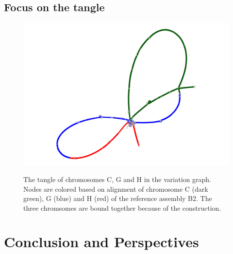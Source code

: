 \subsection{Focus on the tangle}
\begin{figure}[t]
	\centering
	\includegraphics[width=.8\linewidth]{figures/tangle_chrCGH_B2_Cgreen_Gblue_Hred.png}
	\label{fig:lodelo_graph_tangle}
	\caption{The tangle of chromosomes C, G and H in the \mcactus variation graph. Nodes are colored based on \minigraph alignment of chromosome C (dark green), G (blue) and H (red) of the reference assembly B2. The three chromsomes are bound together because of the construction.}
\end{figure}


\section{Conclusion and Perspectives}

\printbibliography